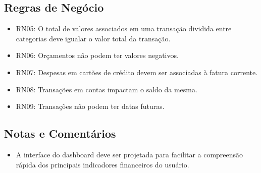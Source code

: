 \subsection*{Regras de Negócio}
\begin{addmargin}[1.5cm]{0cm}
    \begin{itemize}
        \item RN05: O total de valores associados em uma transação dividida entre categorias deve igualar o valor total da transação.
        \item RN06: Orçamentos não podem ter valores negativos.
        \item RN07: Despesas em cartões de crédito devem ser associadas à fatura corrente.
        \item RN08: Transações em contas impactam o saldo da mesma.
        \item RN09: Transações não podem ter datas futuras.
    \end{itemize}
\end{addmargin}

\subsection*{Notas e Comentários}
\begin{addmargin}[1.5cm]{0cm}
    \begin{itemize}
        \item A interface do dashboard deve ser projetada para facilitar a compreensão rápida dos principais indicadores financeiros do usuário.
    \end{itemize}
\end{addmargin}
